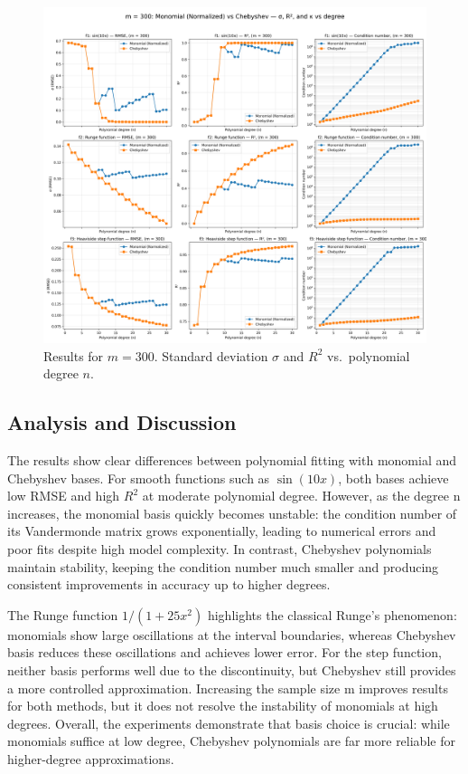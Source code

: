 \documentclass[a4paper,12pt]{article}
\begin{document}
\begin{figure}[h!]
    \centering
    \includegraphics[width=\textwidth]{fig/results_m300.png}
    \caption{Results for $m=300$. Standard deviation $\sigma$ and $R^2$ vs.\ polynomial degree $n$.}
    \label{fig:300}
\end{figure}


\subsection*{Analysis and Discussion}
The results show clear differences between polynomial fitting with monomial and Chebyshev bases. For smooth functions such as $\sin(10x)$, both bases achieve low RMSE and high $R^2$ at moderate polynomial degree. However, as the degree n increases, the monomial basis quickly becomes unstable: the condition number of its Vandermonde matrix grows exponentially, leading to numerical errors and poor fits despite high model complexity. In contrast, Chebyshev polynomials maintain stability, keeping the condition number much smaller and producing consistent improvements in accuracy up to higher degrees.

The Runge function $1/(1+25x^2)$ highlights the classical Runge’s phenomenon: monomials show large oscillations at the interval boundaries, whereas Chebyshev basis reduces these oscillations and achieves lower error. For the step function, neither basis performs well due to the discontinuity, but Chebyshev still provides a more controlled approximation. Increasing the sample size m improves results for both methods, but it does not resolve the instability of monomials at high degrees. Overall, the experiments demonstrate that basis choice is crucial: while monomials suffice at low degree, Chebyshev polynomials are far more reliable for higher-degree approximations.
\end{document}
